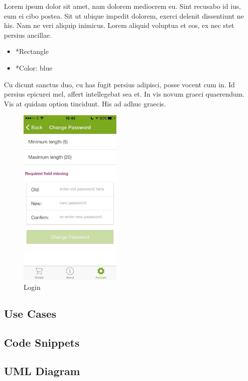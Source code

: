 \begin{minipage}{0.55\textwidth}
	Lorem ipsum dolor sit amet, nam dolorem mediocrem eu. Sint recusabo id ius, eum ei cibo postea. Sit ut ubique impedit dolorem, exerci delenit dissentiunt ne his. Nam ne veri aliquip inimicus. Lorem aliquid voluptua et eos, ex nec stet persius ancillae.
	\begin{itemize}
		\item *Rectangle
		\item *Color: blue
	\end{itemize}
	Cu dicunt sanctus duo, cu has fugit persius adipisci, posse vocent cum in. Id persius epicurei mel, affert intellegebat sea et. In vis novum graeci quaerendum. Vis at quidam option tincidunt. His ad adhuc graecis.
\end{minipage}
\begin{minipage}{5cm}
	\begin{figure}[H]
		\includegraphics[width=5cm]{img/mobile-app/screen-shots/IMG_2918.jpg}
		\caption{Login}
	\end{figure}
\end{minipage} \hfill
    
\subsection{Use Cases}

\subsection{Code Snippets}

\subsection{UML Diagram}

